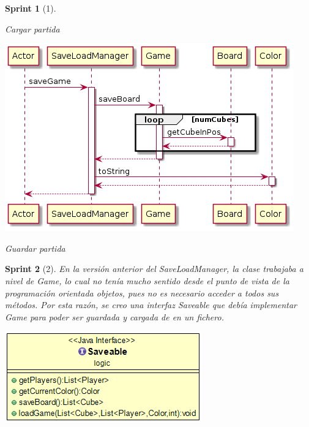 \documentclass{article}
\theoremstyle{break}
\newtheorem*{sprint}{Sprint}
\begin{document}
\begin{sprint}[1]
\begin{center}
Cargar partida
\end{center}

\begin{center}
\centering
\includegraphics[scale=0.5]{save-game-sprint1.png}

Guardar partida
\end{center}
\end{sprint}

\begin{sprint}[2]
En la versión anterior del \textit{SaveLoadManager}, la clase trabajaba a nivel de \textit{Game}, lo cual no tenía mucho sentido desde el punto de vista de la programación orientada objetos, pues no es necesario acceder a todos sus métodos. Por esta razón, se creo una interfaz \textit{Saveable} que debía implementar \textit{Game} para poder ser guardada y cargada de en un fichero.

\begin{center}
\centering
\includegraphics[scale=0.5]{saveable-sprint2.png}
\end{center}

\end{sprint}
\end{document}
